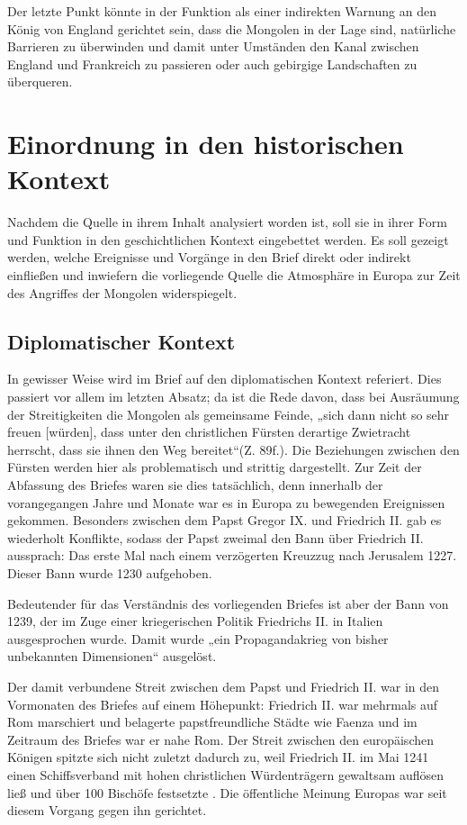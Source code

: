 \documentclass{../../sem_paper}
\begin{document}
Der letzte Punkt könnte in der Funktion als einer indirekten Warnung an den König
von England gerichtet sein, dass die Mongolen in der Lage sind, natürliche Barrieren zu
überwinden und damit unter Umständen den Kanal zwischen England und Frankreich
zu passieren oder auch gebirgige Landschaften zu überqueren.
\section{Einordnung in den historischen Kontext}
Nachdem die Quelle in ihrem Inhalt analysiert worden ist, soll sie in ihrer Form und
Funktion in den geschichtlichen Kontext eingebettet werden. Es soll gezeigt werden,
welche Ereignisse und Vorgänge in den Brief direkt oder indirekt einfließen und
inwiefern die vorliegende Quelle die Atmosphäre in Europa zur Zeit des Angriffes der
Mongolen widerspiegelt.
\subsection{Diplomatischer Kontext}
In gewisser Weise wird im Brief auf den diplomatischen Kontext referiert. Dies
passiert vor allem im letzten Absatz; da ist die Rede davon, dass bei Ausräumung der
Streitigkeiten die Mongolen als gemeinsame Feinde, „sich dann nicht so sehr freuen
[würden], dass unter den christlichen Fürsten derartige Zwietracht herrscht, dass sie
ihnen den Weg bereitet“(Z. 89f.). Die Beziehungen zwischen den Fürsten werden hier
als problematisch und strittig dargestellt. Zur Zeit der Abfassung des Briefes waren sie
dies tatsächlich, denn innerhalb der vorangegangen Jahre und Monate war es in Europa
zu bewegenden Ereignissen gekommen. Besonders zwischen dem Papst Gregor IX. und
Friedrich II. gab es wiederholt Konflikte, sodass der Papst zweimal den Bann über
Friedrich II. aussprach: Das erste Mal nach einem verzögerten Kreuzzug nach Jerusalem
1227. Dieser Bann wurde 1230 aufgehoben. 

Bedeutender für das Verständnis des
vorliegenden Briefes ist aber der Bann von 1239, der im Zuge einer kriegerischen
Politik
Friedrichs
II.
in
Italien
ausgesprochen
wurde.
Damit
wurde
„ein
Propagandakrieg von bisher unbekannten Dimensionen“\autocite[79]{beduerf2000} ausgelöst.

Der damit verbundene Streit zwischen dem Papst und Friedrich II. war in den
Vormonaten des Briefes auf einem Höhepunkt: Friedrich II. war mehrmals auf Rom
marschiert und belagerte papstfreundliche Städte wie Faenza und im Zeitraum des
Briefes war er nahe Rom. Der Streit zwischen den europäischen Königen spitzte sich
nicht zuletzt dadurch zu, weil Friedrich II. im Mai 1241 einen Schiffsverband mit hohen
christlichen Würdenträgern gewaltsam auflösen ließ und über 100 Bischöfe festsetzte\autocite[138]{rotter2000} .
Die öffentliche Meinung Europas war seit diesem Vorgang gegen ihn gerichtet.\autocite[69]{schaller1998}
\end{document}
